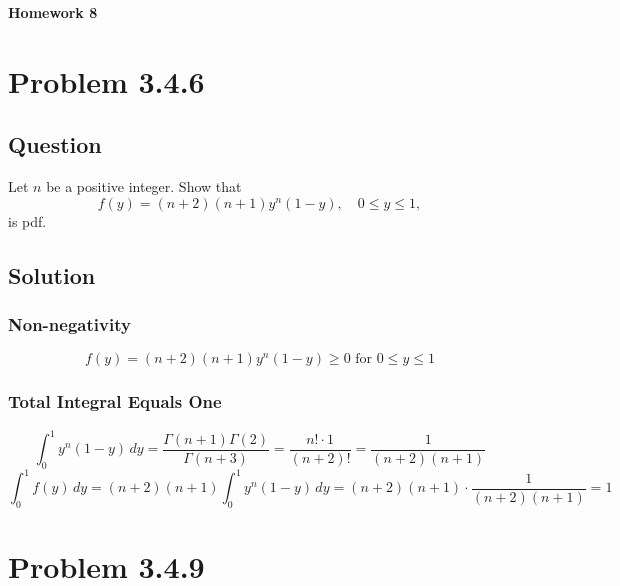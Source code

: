 \documentclass[12pt]{article}
\begin{document}
\begin{center}
  \Large \textbf{Homework 8}
\end{center}

\section*{Problem 3.4.6}
\subsection*{Question}
Let \( n \) be a positive integer. Show that 
\[ f(y) = (n+2)(n+1)y^n(1-y), \quad 0 \leq y \leq 1, \]
is pdf.

\subsection*{Solution}

\subsubsection*{Non-negativity}
\[
f(y) = (n+2)(n+1)y^n(1-y) \geq 0 \text{ for } 0 \leq y \leq 1
\]

\subsubsection*{Total Integral Equals One}
\[
\int_{0}^{1} y^n(1-y) \, dy = \frac{\Gamma(n+1)\Gamma(2)}{\Gamma(n+3)} = \frac{n! \cdot 1}{(n+2)!} = \frac{1}{(n+2)(n+1)}
\]
\[
\int_{0}^{1} f(y) \, dy = (n+2)(n+1) \int_{0}^{1} y^n(1-y) \, dy = (n+2)(n+1) \cdot \frac{1}{(n+2)(n+1)} = 1
\]

\newpage
\section*{Problem 3.4.9}
\end{document}
